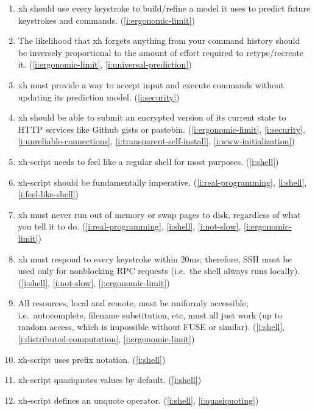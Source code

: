 \documentclass{report}
\begin{document}
\begin{enumerate}
\item{}\label{i:universal-prediction}
  xh should use every keystroke to build/refine a model it uses to predict
  future keystrokes and commands.
    (\ref{i:ergonomic-limit})
\item{}\label{i:forgetful-history}
  The likelihood that xh forgets anything from your command history should
  be inversely proportional to the amount of effort required to
  retype/recreate it.
    (\ref{i:ergonomic-limit},
     \ref{i:universal-prediction})
\item{}\label{i:locally-anonymous}
  xh must provide a way to accept input and execute commands without
  updating its prediction model.
    (\ref{i:security})
\item{}\label{i:http-client}
  xh should be able to submit an encrypted version of its current state to
  HTTP services like Github gists or pastebin.
    (\ref{i:ergonomic-limit},
     \ref{i:security},
     \ref{i:unreliable-connections},
     \ref{i:transparent-self-install},
     \ref{i:www-initialization})

\item{}\label{i:feel-like-shell}
  xh-script needs to feel like a regular shell for most purposes.
    (\ref{i:shell})
\item{}\label{i:imperative}
  xh-script should be fundamentally imperative.
    (\ref{i:real-programming},
     \ref{i:shell},
     \ref{i:feel-like-shell})
\item{}\label{i:no-oome}
  xh must never run out of memory or swap pages to disk, regardless of what
  you tell it to do.
    (\ref{i:real-programming},
     \ref{i:shell},
     \ref{i:not-slow},
     \ref{i:ergonomic-limit})
\item{}\label{i:nonblocking}
  xh must respond to every keystroke within 20ms; therefore, SSH must be
  used only for nonblocking RPC requests (i.e.~the shell always runs
  locally).
    (\ref{i:shell},
     \ref{i:not-slow},
     \ref{i:ergonomic-limit})
\item{}\label{i:remote-resources}
  All resources, local and remote, must be uniformly accessible;
  i.e.~autocomplete, filename substitution, etc, must all just work (up to
  random access, which is impossible without FUSE or similar).
    (\ref{i:shell},
     \ref{i:distributed-computation},
     \ref{i:ergonomic-limit})

\item{}\label{i:prefix-notation}
  xh-script uses prefix notation.
    (\ref{i:shell})
\item{}\label{i:quasiquoting}
  xh-script quasiquotes values by default.
    (\ref{i:shell})
\item{}\label{i:unquoting}
  xh-script defines an unquote operator.
    (\ref{i:shell},
     \ref{i:quasiquoting})


\end{enumerate}
\end{document}
